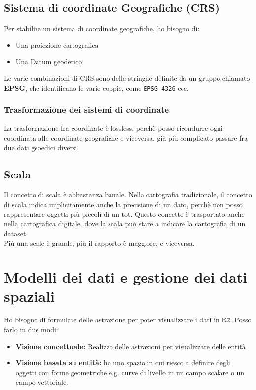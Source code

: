 \documentclass[a4paper,12pt]{article}
\begin{document}
\subsection{Sistema di coordinate Geografiche (CRS)}
Per stabilire un sistema di coordinate geografiche, ho bisogno di:
\begin{itemize}
\item Una proiezione cartografica
\item Una Datum geodetico
\end{itemize}

Le varie combinazioni di CRS sono delle stringhe definite da un gruppo chiamato \textbf{EPSG}, che identificano le varie coppie, come \texttt{EPSG 4326} ecc.

\subsubsection{Trasformazione dei sistemi di coordinate}
La trasformazione fra coordinate è lossless, perchè posso ricondurre ogni coordinata alle coordinate geografiche e viceversa. \E già più complicato passare fra due dati geoedici diversi.

\subsection{Scala}
Il concetto di scala è abbastanza banale. Nella cartografia tradizionale, il concetto di scala indica implicitamente anche la precisione di un dato, perchè non posso rappresentare oggetti più piccoli di un tot. Questo concetto è trasportato anche nella cartografica digitale, dove la scala può stare a indicare la cartografia di un dataset.\\
Più una scale è grande, più il rapporto è maggiore, e viceversa.

\section{Modelli dei dati e gestione dei dati spaziali}
Ho bisogno di formulare delle astrazione per poter visualizzare i dati in R\^2. Posso farlo in due modi:
\begin{itemize}
\item \textbf{Visione concettuale:} Realizzo delle astrazioni per visualizzare delle entità
\item \textbf{Visione basata su entità:} ho uno spazio in cui riesco a definire degli oggetti con forme geometriche e.g. curve di livello in un campo scalare o un campo vettoriale.
\end{itemize}
\end{document}
